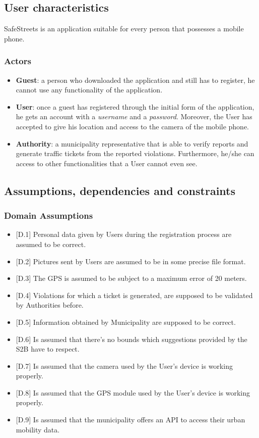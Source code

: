 \newpage
\subsection{User
characteristics}
SafeStreets is an application suitable for every person that possesses a mobile phone.
\subsubsection{Actors}
\begin{itemize}
    \item \textbf{Guest}: a person who downloaded the application and still has to register, he cannot use any functionality of the application.
    \item \textbf{User}: once a guest has registered through the initial form of the application, he gets an account with a \textit{username} and a \textit{password}. Moreover, the User has accepted to give his location and access to the camera of the mobile phone.
    \item \textbf{Authority}: a municipality representative that is able to verify reports and generate traffic tickets from the reported violations. Furthermore, he/she can access to other functionalities that a User cannot even see.
\end{itemize}
\subsection{Assumptions,
dependencies
and
constraints}


\subsubsection{Domain Assumptions}
\begin{itemize}
    \item {[D.1]} Personal data given by Users during the registration process are assumed to be correct.
    \item {[D.2]} Pictures sent by Users are assumed to be in some precise file format.
    \item {[D.3]} The GPS is assumed to be subject to a maximum error of 20 meters.
    \item {[D.4]} Violations for which a ticket is generated, are supposed to be validated by Authorities before.
    \item {[D.5]} Information obtained by Municipality are supposed to be correct.
    \item {[D.6]} Is assumed that there's no bounds which suggestions provided by the S2B have to respect.
    \item {[D.7]} Is assumed that the camera used by the User's device is working properly.
    \item {[D.8]} Is assumed that the GPS module used by the User's device is working properly.
     \item {[D.9]} Is assumed that the municipality offers an API to access their urban mobility data.
    
\end{itemize}

